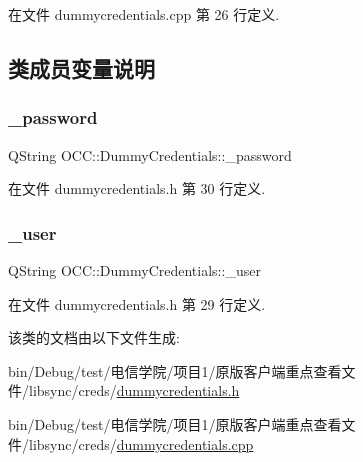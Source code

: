 在文件 dummycredentials.\+cpp 第 26 行定义.



\subsection{类成员变量说明}
\mbox{\label{class_o_c_c_1_1_dummy_credentials_a3fbd6fa98b3fd08b83bbce9059aa02f1}} 
\subsubsection{\texorpdfstring{\+\_\+password}{\_password}}
{\footnotesize\ttfamily Q\+String O\+C\+C\+::\+Dummy\+Credentials\+::\+\_\+password}



在文件 dummycredentials.\+h 第 30 行定义.

\mbox{\label{class_o_c_c_1_1_dummy_credentials_a9bd3d96ad6b7cad930196cf2c5d046e2}} 
\subsubsection{\texorpdfstring{\+\_\+user}{\_user}}
{\footnotesize\ttfamily Q\+String O\+C\+C\+::\+Dummy\+Credentials\+::\+\_\+user}



在文件 dummycredentials.\+h 第 29 行定义.



该类的文档由以下文件生成\+:\begin{DoxyCompactItemize}
\item 
bin/\+Debug/test/电信学院/项目1/原版客户端重点查看文件/libsync/creds/\hyperlink{dummycredentials_8h}{dummycredentials.\+h}\item 
bin/\+Debug/test/电信学院/项目1/原版客户端重点查看文件/libsync/creds/\hyperlink{dummycredentials_8cpp}{dummycredentials.\+cpp}\end{DoxyCompactItemize}

